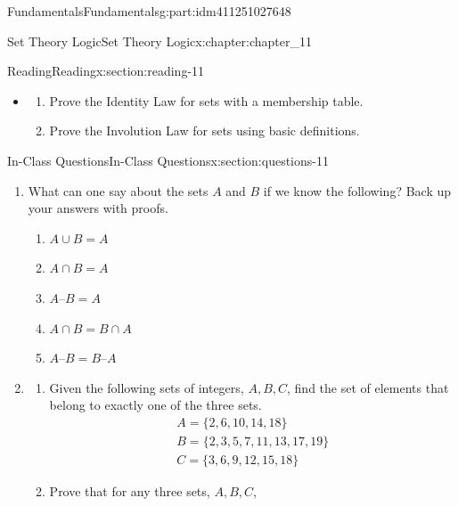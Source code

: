 \documentclass[oneside,10pt,]{book}
\numberwithin{equation}{section}
\begin{document}
\begin{partptx}{Fundamentals}{}{Fundamentals}{}{}{g:part:idm411251027648}
\begin{chapterptx}{Set Theory Logic}{}{Set Theory Logic}{}{}{x:chapter:chapter_11}
\begin{sectionptx}{Reading}{}{Reading}{}{}{x:section:reading-11}
\begin{itemize}[label=\textbullet]
\begin{enumerate}[label=(\alph*)]
\item{}Let \(A\), \(B\), and \(C\) be sets. If \(A\subseteq B\) and \(B\subseteq C\), then \(A\subseteq C\).%
\item{}Let \(A,B, \textrm{ and } C\) be sets. If (\(A\subseteq B\) and \(A\subseteq C\)) then \(A\subseteq B\cap C\).%
\item{}Let \(A,B, \textrm{ and } C\) be sets with \(C\neq \emptyset\). If \(A\subseteq B\) then \(A\times C \subseteq B\times C\).%
\end{enumerate}
%
\item{}%
\begin{enumerate}[label=(\alph*)]
\item{}Prove the Identity Law for sets  with a membership table.%
\item{}Prove the Involution Law  for sets using basic definitions.%
\end{enumerate}
%
\end{itemize}
%
\end{sectionptx}
%
%
\typeout{************************************************}
\typeout{************************************************}
%
\begin{sectionptx}{In-Class Questions}{}{In-Class Questions}{}{}{x:section:questions-11}
%
\begin{enumerate}[label=\arabic*.]
\item{}What can one say about the sets \(A\) and \(B\) if we know the following?  Back up your answers with proofs.%
\begin{enumerate}[label=(\alph*)]
\item{}\(A \cup B = A\)%
\item{}\(A\cap B = A\)%
\item{}\(A–B = A\)%
\item{}\(A\cap B = B\cap A\)%
\item{}\(A–B = B–A\)%
\end{enumerate}
%
\item{}%
\begin{enumerate}[label=(\alph*)]
\item{}Given the following sets of integers, \(A, B, C\), find the set of elements that belong to exactly one of the three sets.%
\begin{gather*}
A=\{2,6,10,14,18\}\\
B=\{2,3,5,7,11,13,17,19\}\\
C=\{3,6,9,12,15,18\}
\end{gather*}
%
\item{}Prove that for any three sets, \(A, B, C\),%

\end{enumerate}
\end{enumerate}
\end{sectionptx}
\end{chapterptx}
\end{partptx}
\end{document}
